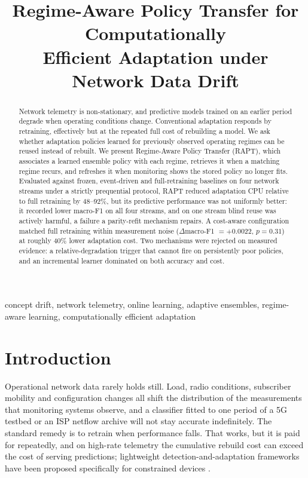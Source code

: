 \documentclass[conference]{IEEEtran}
\begin{document}
\title{Regime-Aware Policy Transfer for Computationally\\ Efficient Adaptation under Network Data Drift}

\author{
}

\maketitle

\begin{abstract}
Network telemetry is non-stationary, and predictive models trained on an earlier
period degrade when operating conditions change. Conventional adaptation responds by
retraining, effectively but at the repeated full cost of rebuilding a model. We ask
whether adaptation policies learned for previously observed operating regimes can be
reused instead of rebuilt. We present Regime-Aware Policy Transfer (RAPT), which
associates a learned ensemble policy with each regime, retrieves it when a matching
regime recurs, and refreshes it when monitoring shows the stored policy no longer
fits. Evaluated against frozen, event-driven and full-retraining baselines on four
network streams under a strictly prequential protocol, RAPT reduced adaptation CPU
relative to full retraining by 48--92\%, but its predictive performance was not
uniformly better: it recorded lower macro-F1 on all four streams, and on one stream
blind reuse was actively harmful, a failure a parity-refit mechanism repairs. A
cost-aware configuration matched full retraining within measurement noise
($\Delta$macro-F1 $=+0.0022$, $p=0.31$) at roughly 40\% lower adaptation cost. Two
mechanisms were rejected on measured evidence: a relative-degradation trigger that
cannot fire on persistently poor policies, and an incremental learner dominated on
both accuracy and cost.
\end{abstract}

\begin{IEEEkeywords}
concept drift, network telemetry, online learning, adaptive ensembles,
regime-aware learning, computationally efficient adaptation
\end{IEEEkeywords}

\section{Introduction}

Operational network data rarely holds still. Load, radio conditions, subscriber
mobility and configuration changes all shift the distribution of the measurements
that monitoring systems observe, and a classifier fitted to one period of a 5G
testbed or an ISP netflow archive will not stay accurate indefinitely. The standard
remedy is to retrain when performance falls. That works, but it is paid for
repeatedly, and on high-rate telemetry the cumulative rebuild cost can exceed the
cost of serving predictions; lightweight detection-and-adaptation frameworks have
been proposed specifically for constrained devices \cite{9427288}.
\end{document}
